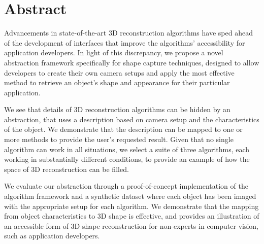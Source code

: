 
\chapter{Abstract}

Advancements in state-of-the-art 3D reconstruction algorithms have sped ahead of the development of interfaces that improve the algorithms' accessibility for application developers. In light of this discrepancy, we propose a novel abstraction framework specifically for shape capture techniques, designed to allow developers to create their own camera setups and apply the most effective method to retrieve an object's shape and appearance for their particular application.

We see that details of 3D reconstruction algorithms can be hidden by an abstraction, that uses a description based on camera setup and the characteristics of the object. We demonstrate that the description can be mapped to one or more methods to provide the user's requested result. Given that no single algorithm can work in all situations, we select a suite of three algorithms, each working in substantially different conditions, to provide an example of how the space of 3D reconstruction can be filled.

We evaluate our abstraction through a proof-of-concept implementation of the algorithm framework and a synthetic dataset where each object has been imaged with the appropriate setup for each algorithm. We demonstrate that the mapping from object characteristics to 3D shape is effective, and provides an illustration of an accessible form of 3D shape reconstruction for non-experts in computer vision, such as application developers.

